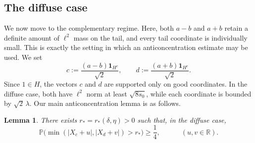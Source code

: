 \documentclass[11pt]{amsart}
\numberwithin{equation}{section}
\newtheorem{lemma}[theorem]{Lemma}
\theoremstyle{definition}
\theoremstyle{remark}
\newcommand{\Prob}{\mathbb P}
\newcommand{\R}{\mathbb R}
\newcommand{\abs}[1]{\lvert #1 \rvert}
\begin{document}
\subsection{The diffuse case}
We now move to the complementary regime.  Here, both $a-b$ and $a+b$ retain a
definite amount of $\ell^2$ mass on the tail, and every tail coordinate is
individually small.  This is exactly the setting in which an 
anticoncentration estimate may be used.
We set
\[
c:=\frac{(a-b)\mathbf 1_{H^c}}{\sqrt2},
\qquad
d:=\frac{(a+b)\mathbf 1_{H^c}}{\sqrt2}.
\]
Since $1\in H$, the vectors $c$ and $d$ are supported only on good
coordinates.  In the diffuse case, both have $\ell^2$ norm at least
$\sqrt{8s_0}$, while each coordinate is bounded by $\sqrt2\,\lambda$.
Our main anticoncentration lemma is as follows.

\begin{lemma}\label{lem:cross}
There exists $r_*=r_*(\delta,\eta)>0$ such that, in the diffuse case,
\[
\Prob\bigl(\min(\abs{X_c+u},\abs{X_d+v})>r_*\bigr)\ge \frac14, \quad 
\qquad(u,v\in\R).
\]
\end{lemma}
\end{document}
